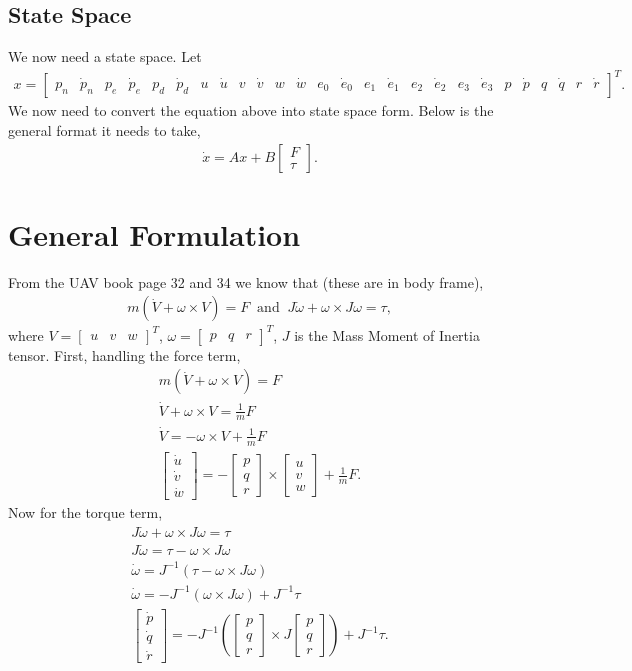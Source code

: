 \documentclass[11pt]{article}
\newcommand{\mathse}[1]{\begin{gather*}#1\end{gather*}}
\newcommand{\mat}[1]{\begin{bmatrix} #1 \end{bmatrix}}
\begin{document}
\subsection{State Space}
We now need a state space. Let 
\mathse{
    x = \mat{p_n & \dot{p}_n & p_e & \dot{p}_e & p_d & \dot{p}_d & u & \dot{u} & v & \dot{v} & w & \dot{w} & e_0 & \dot{e}_0 & e_1 & \dot{e}_1 & e_2 & \dot{e}_2 & e_3 & \dot{e}_3 & p & \dot{p} & q & \dot{q} & r & \dot{r}}^T.
}
We now need to convert the equation above into state space form. Below is the general format it needs to take,
\mathse{
    \dot{x} = Ax + B\mat{F\\ \tau}.
}

\section{General Formulation}
From the UAV book page 32 and 34 we know that (these are in body frame),
\mathse{
    m\left(\dot{V} + \omega\times V\right) = F\;\;\text{and}\;\; J\dot{\omega} + \omega\times J\omega = \tau,
}
where $V = \mat{u & v & w}^T$, $\omega = \mat{p & q & r}^T$, $J$ is the Mass Moment of Inertia tensor. First, handling the force term,
\mathse{
    m\left(\dot{V} + \omega\times V\right) = F\\
    \dot{V} + \omega\times V = \frac{1}{m}F\\
    \dot{V} = -\omega\times V + \frac{1}{m}F\\
    \boxed{\mat{\dot{u}\\ \dot{v}\\ \dot{w}} = -\mat{p\\ q\\ r}\times\mat{u\\ v\\ w} + \frac{1}{m}F}.
}
Now for the torque term,
\mathse{
    J\dot{\omega} + \omega\times J\omega = \tau\\
    J\dot{\omega}  = \tau - \omega\times J\omega\\
    \dot{\omega}  = J^{-1}\left(\tau - \omega\times J\omega\right)\\
    \dot{\omega}  = -J^{-1}\left(\omega\times J\omega\right) + J^{-1}\tau\\
    \boxed{\mat{\dot{p}\\ \dot{q}\\ \dot{r}}  = -J^{-1}\left(\mat{p\\ q\\ r}\times J\mat{p\\ q\\ r}\right) + J^{-1}\tau}.
}
\end{document}
